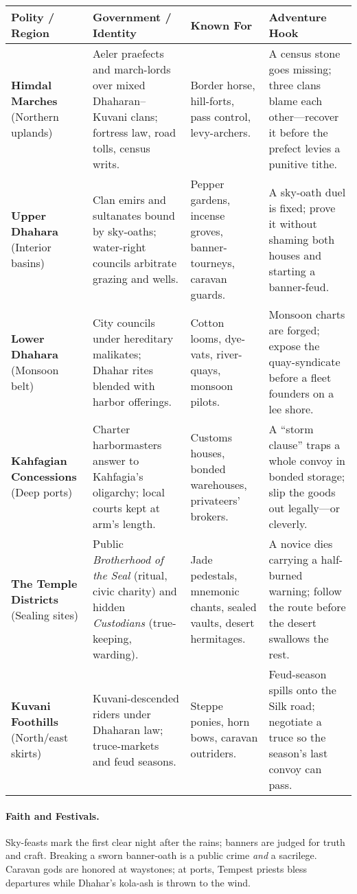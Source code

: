 \documentclass[11pt]{book}
\begin{document}
\begin{center}
\begin{tabular}{|p{3.4cm}|p{4.1cm}|p{4.2cm}|p{5.2cm}|}
\hline
\textbf{Polity / Region} & \textbf{Government / Identity} & \textbf{Known For} & \textbf{Adventure Hook} \\
\hline
\textbf{Himdal Marches} (Northern uplands) & Aeler praefects and march-lords over mixed Dhaharan--Kuvani clans; fortress law, road tolls, census writs. & Border horse, hill-forts, pass control, levy-archers. & A census stone goes missing; three clans blame each other—recover it before the prefect levies a punitive tithe. \\
\hline
\textbf{Upper Dhahara} (Interior basins) & Clan emirs and sultanates bound by sky-oaths; water-right councils arbitrate grazing and wells. & Pepper gardens, incense groves, banner-tourneys, caravan guards. & A sky-oath duel is fixed; prove it without shaming both houses and starting a banner-feud. \\
\hline
\textbf{Lower Dhahara} (Monsoon belt) & City councils under hereditary malikates; Dhahar rites blended with harbor offerings. & Cotton looms, dye-vats, river-quays, monsoon pilots. & Monsoon charts are forged; expose the quay-syndicate before a fleet founders on a lee shore. \\
\hline
\textbf{Kahfagian Concessions} (Deep ports) & Charter harbormasters answer to Kahfagia’s oligarchy; local courts kept at arm’s length. & Customs houses, bonded warehouses, privateers’ brokers. & A “storm clause” traps a whole convoy in bonded storage; slip the goods out legally—or cleverly. \\
\hline
\textbf{The Temple Districts} (Sealing sites) & Public \emph{Brotherhood of the Seal} (ritual, civic charity) and hidden \emph{Custodians} (true-keeping, warding). & Jade pedestals, mnemonic chants, sealed vaults, desert hermitages. & A novice dies carrying a half-burned warning; follow the route before the desert swallows the rest. \\
\hline
\textbf{Kuvani Foothills} (North/east skirts) & Kuvani-descended riders under Dhaharan law; truce-markets and feud seasons. & Steppe ponies, horn bows, caravan outriders. & Feud-season spills onto the Silk road; negotiate a truce so the season’s last convoy can pass. \\
\hline
\end{tabular}
\end{center}

\paragraph{Faith and Festivals.}
Sky-feasts mark the first clear night after the rains; banners are judged for truth and craft. Breaking a sworn banner-oath is a public crime \emph{and} a sacrilege. Caravan gods are honored at waystones; at ports, Tempest priests bless departures while Dhahar’s kola-ash is thrown to the wind.
\end{document}
